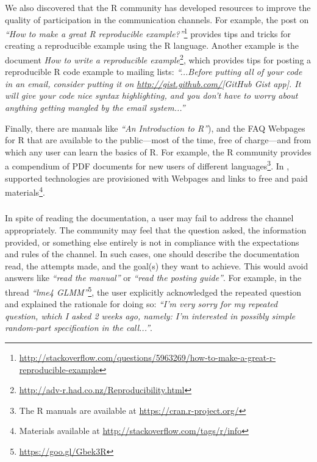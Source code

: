 We also discovered that the R community has developed resources to improve the quality of participation in the communication channels.
    For example, the post on \SO \textit{``How to make a great R reproducible example?''}\footnote{\href{http://stackoverflow.com/questions/5963269/how-to-make-a-great-r-reproducible-example}{http://stackoverflow.com/questions/5963269/how-to-make-a-great-r-reproducible-example}} provides tips and tricks for creating a reproducible example using the R language.
    Another example is the document \emph{How to write a reproducible
      example}\footnote{\url{http://adv-r.had.co.nz/Reproducibility.html}}, which provides tips for posting a reproducible R code example to mailing lists: \textit{``...Before putting all of your code in an email, consider putting it on \url{http://gist.github.com/}{[GitHub Gist app]}. It will give your code nice syntax highlighting, and you don't have to worry about anything getting mangled by the email system...''}

    Finally, there are manuals like \textit{``An Introduction to R''}), and the FAQ Webpages for R that are available to the public---most of the time, free of charge---and from which any user can learn the basics of R.
    For example, the R community provides a compendium of PDF documents for new users of different languages\footnote{The R manuals are available at \url{https://cran.r-project.org/}}.
    In \SO, supported technologies are provisioned with Webpages and links to free and paid materials\footnote{Materials available at \url{http://stackoverflow.com/tags/r/info}}.



\subsubsection{\recc}

    In spite of reading the documentation, a user may fail to address the channel appropriately.
    The community may feel that the question asked, the information provided, or something else entirely is not in compliance with the expectations and rules of the channel.
    In such cases, one should describe the documentation read, the attempts made, and the goal(s) they want to achieve.
    This would avoid answers like \textit{``read the manual''} or \textit{``read the posting guide''}. %
    For example, in the thread \textit{``lme4 GLMM''}\footnote{\url{https://goo.gl/Gbek3R}}, the user explicitly acknowledged the repeated question and explained the rationale for doing so: \textit{``I'm very sorry for my repeated question, which I asked 2 weeks ago, namely: I'm interested in possibly simple random-part specification in the call...''}.


